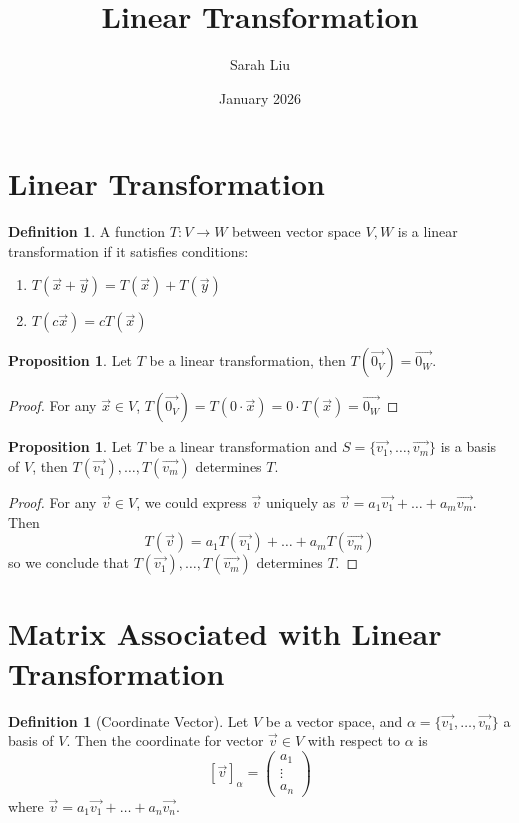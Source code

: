 \documentclass{article}
\title{Linear Transformation}
\author{Sarah Liu}
\date{January 2026}
\theoremstyle{definition}
\newtheorem{proposition}[theorem]{Proposition}
\newtheorem{definition}[theorem]{Definition}
\theoremstyle{remark}
\begin{document}
\maketitle


\section{Linear Transformation}
\begin{definition}
    A function $T:V\rightarrow W$ between vector space $V, W$ is a linear transformation if it satisfies conditions:
    \begin{enumerate}
        \item $T(\vec{x}+\vec{y})=T(\vec{x})+T(\vec{y})$
        \item $T(c\vec{x})=cT(\vec{x})$
    \end{enumerate}
\end{definition}

\begin{proposition}
    Let $T$ be a linear transformation, then $T(\vec{0_V})=\vec{0_W}$.
\end{proposition}

\begin{proof}
    For any $\vec{x} \in V$, $T(\vec{0_V})=T(0\cdot \vec{x})=0\cdot T(\vec{x})=\vec{0_W}$
\end{proof}

\begin{proposition}
    Let $T$ be a linear transformation and $S=\{\vec{v_1},\dots ,\vec{v_m}\}$ is a basis of $V$, then $T(\vec{v_1}), \dots ,T(\vec{v_m})$ determines $T$.
\end{proposition}

\begin{proof}
    For any $\vec{v}\in V$, we could express $\vec{v}$ uniquely as $\vec{v}=a_1\vec{v_1}+\dots+a_m\vec{v_m}$. Then 
    \[
    T(\vec{v})=a_1T(\vec{v_1})+ \dots +a_mT(\vec{v_m})
    \]
    so we conclude that $T(\vec{v_1}), \dots ,T(\vec{v_m})$ determines $T$.
\end{proof}

\section{Matrix Associated with Linear Transformation}

\begin{definition}[Coordinate Vector]
    Let $V$ be a vector space, and $\alpha=\{\vec{v_1},\dots, \vec{v_n}\}$ a basis of $V$. Then the coordinate for vector $\vec{v}\in V$ with respect to $\alpha$ is 
    \[
    [\vec{v}]_{\alpha}=
    \begin{pmatrix}
a_1 \\ \vdots \\ a_n
\end{pmatrix}
    \]
    where $\vec{v}=a_1\vec{v_1}+\dots+a_n\vec{v_n}$.
\end{definition}
\end{document}
